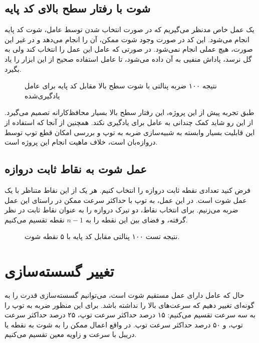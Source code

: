 \subsection{شوت با رفتار سطح بالای کد پایه}
یک عمل خاص مدنظر می‌گیریم که در صورت انتخاب شدن توسط عامل، شوت کد پایه  
انجام می‌شود. این کد در صورت وجود شوت ممکن، آن را انجام می‌دهد و در غیر این صورت، هیچ عملی انجام نمی‌شود.
در صورتی که عامل این عمل را انتخاب کند ولی به گل نرسد، پاداش منفیی به آن داده می‌شود، تا عامل استفاده صحیح از این ابزار را یاد بگیرد.
\begin{figure}[H]
    \centering
    \caption{نتیجه ۱۰۰ ضربه پنالتی با شوت سطح بالا مقابل کد پایه  برای عامل یادگیری‌شده}\label{fig:helios_shoot_pie}
\end{figure}

طبق تجربه پیش از این پروژه، این رفتار سطح بالا بسیار محافظ‌کارانه تصمیم می‌گیرد.
از این رو شاید کمک چندانی به عامل برای یادگیری نکند.
همچنین از آنجا که استفاده از این قابلیت بسیار وابسته به شبیه‌سازی ضربه به توپ و بررسی امکان قطع توپ توسط دروازه‌بان است، خلاف ماهیت انجام این پروژه است.
\subsection{عمل شوت به نقاط ثابت دروازه}
فرض کنید تعدادی نقطه ثابت دروازه را انتخاب کنیم.
هر یک از این نقاط متناظر با یک عمل شوت است.
در این عمل، به توپ با حداکثر سرعت ممکن در راستای این عمل ضربه می‌زنیم.
برای انتخاب نقاط، دو تیرک دروازه را به عنوان نقاط ثابت در نظر گرفته، و فضای بین این نقطه را به $n-1$ نقطه تقسیم می‌کنیم.
\begin{figure}[H]
    \centering
    \caption{نتیجه تست ۱۰۰ پنالتی مقابل کد پایه  با ۵ نقطه شوت.}\label{fig:custom_shoot_pie}
\end{figure}

\section{تغییر گسسته‌سازی}
حال که عامل دارای عمل مستقیم شوت است، می‌توانیم گسسته‌سازی قدرت را به گونه‌ای تغییر دهیم که سرعت‌های بالا را نداشته باشد.
برای این منظور ضربه به توپ را به سه سرعت تقسیم می‌کنیم: ۱۵ درصد حداکثر سرعت توپ، ۲۵ درصد حداکثر سرعت توپ، و ۵۰ درصد حداکثر سرعت توپ.
در واقع اعمال ممکن را به شوت به نقطه یا دریبل با سرعت و زاویه معین تقسیم می‌کنیم.

